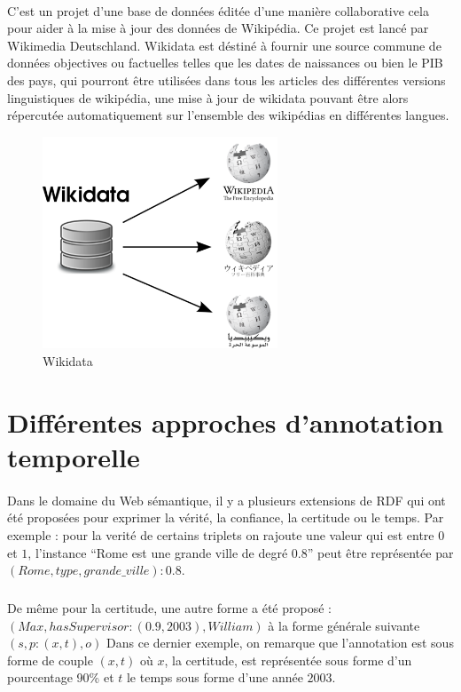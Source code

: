 \documentclass[12pt,a4]{report}
\begin{document}
\paragraph{}
C'est un projet d'une base de données éditée d'une manière collaborative cela pour aider à la mise à jour des données de Wikipédia. Ce projet est lancé par Wikimedia Deutschland. Wikidata est déstiné à fournir une source commune de données objectives ou factuelles telles que les dates de naissances ou bien le PIB des pays, qui pourront être utilisées dans tous les articles des différentes versions linguistiques de wikipédia, une mise à jour de wikidata  pouvant être alors répercutée automatiquement sur l'ensemble des wikipédias en différentes langues.   
\begin{figure}[H]
\centering
\includegraphics[width=7cm]{wikidatawikipedia.png}
\caption{Wikidata}
\end{figure}
\newpage
\section{Différentes approches d'annotation temporelle}			
\paragraph{}
Dans le domaine du Web sémantique, il y a plusieurs extensions de RDF qui ont été proposées pour exprimer la vérité, la confiance, la certitude ou le temps.
Par exemple : pour la verité de certains triplets on rajoute une valeur qui est entre $0$ et $1$, l’instance “Rome est une grande ville de degré 0.8” peut être représentée par $(Rome, type,grande{\_}ville) : 0.8$.
\subparagraph{}
De même pour la certitude, une autre forme a été proposé :
\newline
$(Max,hasSupervisor : (0.9,2003),William)$ à la forme générale suivante $(s, p : (x,t),o)$
\newline
Dans ce dernier exemple, on remarque que l'annotation est sous forme de couple $(x, t)$ où $x$, la certitude, est représentée sous forme d'un pourcentage 90\% et $t$ le temps sous forme d'une année $2003$.
\end{document}

